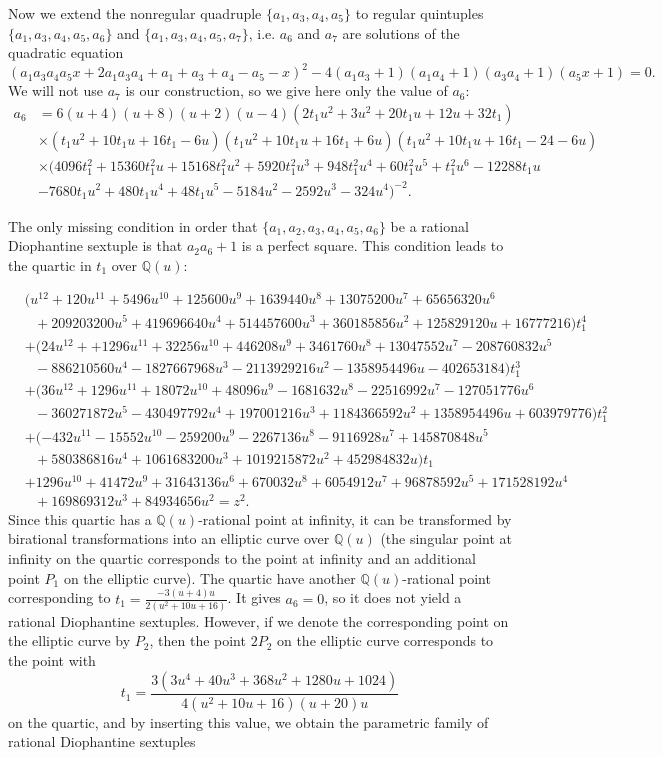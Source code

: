 \documentclass[a4paper]{amsart}
\theoremstyle{plain}
\theoremstyle{definition}
\begin{document}
Now we extend the nonregular quadruple $\{a_1,a_3,a_4,a_5\}$ to regular quintuples
$\{a_1,a_3,a_4,a_5,a_6\}$ and $\{a_1,a_3,a_4,a_5,a_7\}$, i.e. $a_6$ and $a_7$ are solutions
of the quadratic equation
$$ (a_1a_3a_4a_5x+2a_1a_3a_4+a_1+a_3+a_4-a_5-x)^2 -4(a_1a_3+1)(a_1a_4+1)(a_3a_4+1)(a_5x+1) = 0. $$
We will not use $a_7$ is our construction, so we give here only the value of $a_6$:
{\small
\begin{align*}
a_6 &=6(u+4)(u+8)(u+2)(u-4)(2t_1u^2+3u^2+20t_1u+12u+32t_1) \\
\mbox{}&\times (t_1u^2+10t_1u+16t_1-6u)(t_1u^2+10t_1u+16t_1+6u)(t_1u^2+10t_1u+16t_1-24-6u) \\
\mbox{}&\times (4096t_1^2+15360t_1^2u+15168t_1^2u^2+5920t_1^2u^3+948t_1^2u^4+60t_1^2u^5+t_1^2u^6-12288t_1u \\
\mbox{}&-7680t_1u^2+480t_1u^4+48t_1u^5-5184u^2-2592u^3-324u^4)^{-2}.
\end{align*}}%

The only missing condition in order that $\{a_1,a_2,a_3,a_4,a_5,a_6\}$ be a rational Diophantine
sextuple is that $a_2a_6+1$ is a perfect square. This condition leads to the quartic in
$t_1$ over $\mathbb{Q}(u)$:

{\footnotesize
\begin{align*}
& (u^{12}+120u^{11}+5496u^{10}+125600u^9+1639440u^8+13075200u^7+65656320u^6 \\
& \,\,\,\,+209203200u^5+419696640u^4+514457600u^3+360185856u^2+125829120u+16777216)t_1^4 \\
& +(24u^{12}++1296u^{11}+32256u^{10}+446208u^9+3461760u^8+13047552u^7-208760832u^5 \\
& \,\,\,\,-886210560u^4-1827667968u^3-2113929216u^2 -1358954496u-402653184)t_1^3 \\
& +(36u^{12}+1296u^{11}+18072u^{10}+48096u^9-1681632u^8-22516992u^7-127051776u^6 \\
& \,\,\,\,-360271872u^5-430497792u^4+197001216u^3+1184366592u^2 +1358954496u+603979776)t_1^2 \\
& +(-432u^{11}-15552u^{10}-259200u^9 -2267136u^8-9116928u^7+145870848u^5 \\
& \,\,\,\,+580386816u^4+1061683200u^3+1019215872u^2 +452984832u)t_1 \\
& +1296u^{10}+41472u^9+31643136u^6+670032u^8+6054912u^7+96878592u^5+171528192u^4 \\
& \,\,\,\, +169869312u^3+84934656u^2=z^2.
\end{align*}}%
Since this quartic has a $\mathbb{Q}(u)$-rational point at infinity,
it can be transformed by birational transformations
into an elliptic curve over $\mathbb{Q}(u)$
(the singular point at infinity on the quartic corresponds to the point at
infinity and an additional point $P_1$ on the elliptic curve).
The quartic have another $\mathbb{Q}(u)$-rational point
corresponding to $t_1=\frac{-3(u+4)u}{2(u^2+10u+16)}$.
It gives $a_6=0$, so it does not yield a rational Diophantine sextuples.
However, if we denote the corresponding point on the elliptic curve
by $P_2$, then the point $2P_2$ on the elliptic curve corresponds to the point with
$$ t_1= \frac{3(3u^4+40u^3+368u^2+1280u+1024)}
{4(u^2+10u+16)(u+20)u} $$
on the quartic, and by inserting this value, we obtain the parametric family of rational Diophantine sextuples
\end{document}
